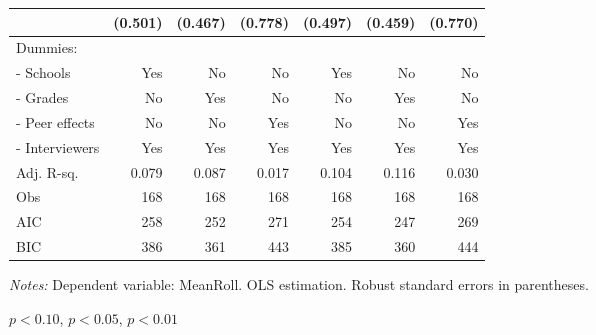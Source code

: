 \begin{table}[htbp]
\begin{adjustbox}{width=1\textwidth}
\begin{threeparttable}
\begin{tabular}{l*{6}{D{.}{.}{-1}}}
                    &             (0.501)   &             (0.467)   &             (0.778)   &             (0.497)   &             (0.459)   &             (0.770)   \\ \midrule
Dummies: &&&&& \\                    
- Schools             &                 Yes   &                  No   &                  No   &                 Yes   &                  No   &                  No   \\
- Grades              &                  No   &                 Yes   &                  No   &                  No   &                 Yes   &                  No   \\
- Peer effects        &                  No   &                  No   &                 Yes   &                  No   &                  No   &                 Yes   \\
- Interviewers        &                 Yes   &                 Yes   &                 Yes   &                 Yes   &                 Yes   &                 Yes   \\
\midrule
Adj. R-sq.          &               0.079   &               0.087   &               0.017   &               0.104   &               0.116   &               0.030   \\
Obs                 &                 168   &                 168   &                 168   &                 168   &                 168   &                 168   \\
AIC                 &                 258   &                 252   &                 271   &                 254   &                 247   &                 269   \\
BIC                 &                 386   &                 361   &                 443   &                 385   &                 360   &                 444   \\
\bottomrule
\end{tabular}
\begin{tablenotes}
\footnotesize
\item \textit{Notes:} Dependent variable: MeanRoll. OLS estimation. Robust standard errors in parentheses. \\
\item \sym{*} \(p<0.10\), \sym{**} \(p<0.05\), \sym{***} \(p<0.01\)
\end{tablenotes}
\end{threeparttable}
\end{adjustbox}
\label{tab:cheat_tot}
\end{table}

